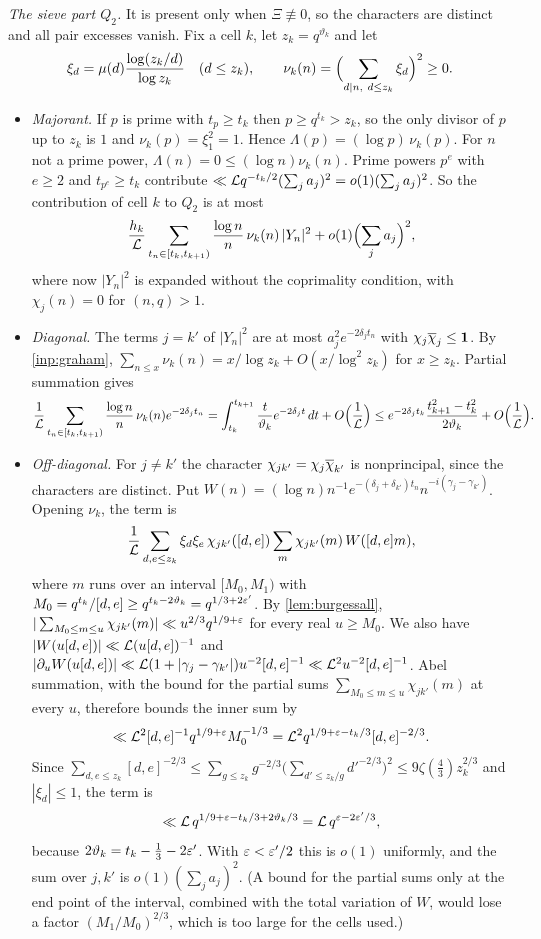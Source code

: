 \emph{The sieve part $Q_2$.} It is present only when $\Xi\not\equiv0$, so the characters are distinct
and all pair excesses vanish. Fix a cell $k$, let $z_k=q^{\vartheta_k}$ and let
\[
  \xi_d=\mu(d)\frac{\log(z_k/d)}{\log z_k}\quad(d\le z_k),\qquad
  \nu_k(n)=\Bigl(\sum_{d\mid n,\ d\le z_k}\xi_d\Bigr)^2\ge0 .
\]
\begin{itemize}
  \item \emph{Majorant.} If $p$ is prime with $t_p\ge t_k$ then $p\ge q^{t_k}>z_k$, so the only
    divisor of $p$ up to $z_k$ is $1$ and $\nu_k(p)=\xi_1^2=1$. Hence
    $\Lambda(p)=(\log p)\,\nu_k(p)$. For $n$ not a prime power, $\Lambda(n)=0\le(\log n)\nu_k(n)$.
    Prime powers $p^e$ with $e\ge2$ and $t_{p^e}\ge t_k$ contribute
    $\ll\mathcal{L} q^{-t_k/2}(\sum_ja_j)^2=o(1)(\sum_ja_j)^2$. So the contribution of cell $k$ to $Q_2$ is
    at most
    \[
      \frac{h_k}{\mathcal{L}}\sum_{t_n\in[t_k,t_{k+1})}\frac{\log n}n\,\nu_k(n)\,|Y_n|^2+o(1)\Bigl(\sum_ja_j\Bigr)^2,
    \]
    where now $|Y_n|^2$ is expanded without the coprimality condition, with $\chi_j(n)=0$ for
    $(n,q)>1$.
  \item \emph{Diagonal.} The terms $j=k'$ of $|Y_n|^2$ are at most $a_j^2e^{-2\delta_jt_n}$ with
    $\chi_j\overline{\chi}_j\le\mathbf{1}$. By \cref{inp:graham}, $\sum_{n\le x}\nu_k(n)=x/\log z_k+O(x/\log^2z_k)$
    for $x\ge z_k$. Partial summation gives
    \[
      \frac1{\mathcal{L}}\sum_{t_n\in[t_k,t_{k+1})}\frac{\log n}n\,\nu_k(n)e^{-2\delta_jt_n}
      =\int_{t_k}^{t_{k+1}}\frac t{\vartheta_k}e^{-2\delta_jt}\,dt+O\Bigl(\frac1{\mathcal{L}}\Bigr)
      \le e^{-2\delta_jt_k}\frac{t_{k+1}^2-t_k^2}{2\vartheta_k}+O\Bigl(\frac1{\mathcal{L}}\Bigr).
    \]
  \item \emph{Off-diagonal.} For $j\ne k'$ the character $\chi_{jk'}=\chi_j\overline{\chi}_{k'}$ is nonprincipal, since the
    characters are distinct.
    Put $W(n)=(\log n)n^{-1}e^{-(\delta_j+\delta_{k'})t_n}n^{-i(\gamma_j-\gamma_{k'})}$. Opening
    $\nu_k$, the term is
    \[
      \frac1{\mathcal{L}}\sum_{d,e\le z_k}\xi_d\xi_e\,\chi_{jk'}([d,e])\sum_{m}\chi_{jk'}(m)\,W([d,e]m),
    \]
    where $m$ runs over an interval $[M_0,M_1)$ with $M_0=q^{t_k}/[d,e]\ge q^{t_k-2\vartheta_k}=
    q^{1/3+2\varepsilon'}$. By \cref{lem:burgessall},
    $|\sum_{M_0\le m\le u}\chi_{jk'}(m)|\ll u^{2/3}q^{1/9+\varepsilon}$ for every real $u\ge M_0$. We also have
    $|W(u[d,e])|\ll\mathcal{L}(u[d,e])^{-1}$ and
    $|\partial_uW(u[d,e])|\ll\mathcal{L}(1+|\gamma_j-\gamma_{k'}|)u^{-2}[d,e]^{-1}\ll\mathcal{L}^2u^{-2}[d,e]^{-1}$.
    Abel summation, with the bound for the partial sums $\sum_{M_0\le m\le u}\chi_{jk'}(m)$ at every
    $u$, therefore bounds the inner sum by
    \[
      \ll\mathcal{L}^2[d,e]^{-1}q^{1/9+\varepsilon}M_0^{-1/3}=\mathcal{L}^2q^{1/9+\varepsilon-t_k/3}[d,e]^{-2/3}.
    \]
    Since $\sum_{d,e\le z_k}[d,e]^{-2/3}\le\sum_{g\le z_k}g^{-2/3}\bigl(\sum_{d'\le z_k/g}d'^{-2/3}\bigr)^2\le
    9\zeta(\frac43)z_k^{2/3}$ and $|\xi_d|\le1$, the term is
    \[
      \ll\mathcal{L}\,q^{1/9+\varepsilon-t_k/3+2\vartheta_k/3}=\mathcal{L}\,q^{\varepsilon-2\varepsilon'/3},
    \]
    because $2\vartheta_k=t_k-\frac13-2\varepsilon'$. With $\varepsilon<\varepsilon'/2$ this is $o(1)$ uniformly, and
    the sum over $j,k'$ is $o(1)(\sum_ja_j)^2$. (A bound for the partial sums only at the end
    point of the interval, combined with the total variation of $W$, would lose a factor
    $(M_1/M_0)^{2/3}$, which is too large for the cells used.)
\end{itemize}
